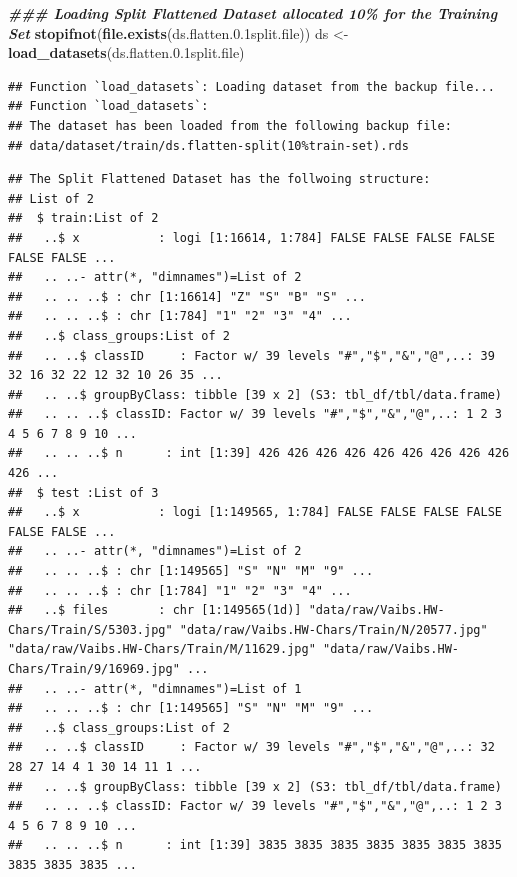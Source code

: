 \documentclass[
]{report}
\newenvironment{Shaded}{\begin{snugshade}}{\end{snugshade}}
\newcommand{\DocumentationTok}[1]{\textcolor[rgb]{0.56,0.35,0.01}{\textbf{\textit{#1}}}}
\newcommand{\FloatTok}[1]{\textcolor[rgb]{0.00,0.00,0.81}{#1}}
\newcommand{\FunctionTok}[1]{\textcolor[rgb]{0.13,0.29,0.53}{\textbf{#1}}}
\newcommand{\NormalTok}[1]{#1}
\newcommand{\OtherTok}[1]{\textcolor[rgb]{0.56,0.35,0.01}{#1}}
\begin{document}
\begin{Shaded}
\begin{Highlighting}[]
\DocumentationTok{\#\#\# Loading Split Flattened Dataset allocated 10\% for the Training Set}
\FunctionTok{stopifnot}\NormalTok{(}\FunctionTok{file.exists}\NormalTok{(ds.flatten.}\FloatTok{0.1}\NormalTok{split.file))}
\NormalTok{ds }\OtherTok{\textless{}{-}} \FunctionTok{load\_datasets}\NormalTok{(ds.flatten.}\FloatTok{0.1}\NormalTok{split.file)}
\end{Highlighting}
\end{Shaded}

\footnotesize

\begin{verbatim}
## Function `load_datasets`: Loading dataset from the backup file... 
## Function `load_datasets`:
## The dataset has been loaded from the following backup file:
## data/dataset/train/ds.flatten-split(10%train-set).rds
\end{verbatim}

\normalsize

\footnotesize

\begin{verbatim}
## The Split Flattened Dataset has the follwoing structure:
## List of 2
##  $ train:List of 2
##   ..$ x           : logi [1:16614, 1:784] FALSE FALSE FALSE FALSE FALSE FALSE ...
##   .. ..- attr(*, "dimnames")=List of 2
##   .. .. ..$ : chr [1:16614] "Z" "S" "B" "S" ...
##   .. .. ..$ : chr [1:784] "1" "2" "3" "4" ...
##   ..$ class_groups:List of 2
##   .. ..$ classID     : Factor w/ 39 levels "#","$","&","@",..: 39 32 16 32 22 12 32 10 26 35 ...
##   .. ..$ groupByClass: tibble [39 x 2] (S3: tbl_df/tbl/data.frame)
##   .. .. ..$ classID: Factor w/ 39 levels "#","$","&","@",..: 1 2 3 4 5 6 7 8 9 10 ...
##   .. .. ..$ n      : int [1:39] 426 426 426 426 426 426 426 426 426 426 ...
##  $ test :List of 3
##   ..$ x           : logi [1:149565, 1:784] FALSE FALSE FALSE FALSE FALSE FALSE ...
##   .. ..- attr(*, "dimnames")=List of 2
##   .. .. ..$ : chr [1:149565] "S" "N" "M" "9" ...
##   .. .. ..$ : chr [1:784] "1" "2" "3" "4" ...
##   ..$ files       : chr [1:149565(1d)] "data/raw/Vaibs.HW-Chars/Train/S/5303.jpg" "data/raw/Vaibs.HW-Chars/Train/N/20577.jpg" "data/raw/Vaibs.HW-Chars/Train/M/11629.jpg" "data/raw/Vaibs.HW-Chars/Train/9/16969.jpg" ...
##   .. ..- attr(*, "dimnames")=List of 1
##   .. .. ..$ : chr [1:149565] "S" "N" "M" "9" ...
##   ..$ class_groups:List of 2
##   .. ..$ classID     : Factor w/ 39 levels "#","$","&","@",..: 32 28 27 14 4 1 30 14 11 1 ...
##   .. ..$ groupByClass: tibble [39 x 2] (S3: tbl_df/tbl/data.frame)
##   .. .. ..$ classID: Factor w/ 39 levels "#","$","&","@",..: 1 2 3 4 5 6 7 8 9 10 ...
##   .. .. ..$ n      : int [1:39] 3835 3835 3835 3835 3835 3835 3835 3835 3835 3835 ...
\end{verbatim}
\end{document}

